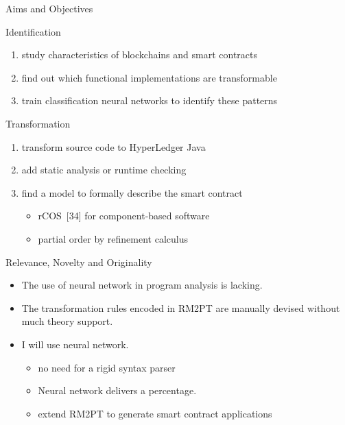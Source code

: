 \documentclass[xcolor=svgnames]{beamer}
\begin{document}
\begin{frame}{Aims and Objectives}

Identification\\
\begin{enumerate}
\item study characteristics of blockchains and smart contracts
\item find out which functional implementations are transformable
\item train classification neural networks to identify these patterns
\end{enumerate}

Transformation\\
\begin{enumerate}
\item transform source code to HyperLedger Java
\item add static analysis or runtime checking
\item find a model to formally describe the smart contract
	\begin{itemize}
	\item rCOS~[34] for component-based software
	\item partial order by refinement calculus
	\end{itemize}
\end{enumerate}

\end{frame}

\begin{frame}{Relevance, Novelty and Originality}
\begin{itemize}
\item The use of neural network in program analysis is lacking.
\item The transformation rules encoded in RM2PT are manually devised without much theory support.
\item I will use neural network.
\begin{itemize}
\item no need for a rigid syntax parser
\item Neural network delivers a percentage.
\item extend RM2PT to generate smart contract applications
\end{itemize}
\end{itemize}


\end{frame}
\end{document}
